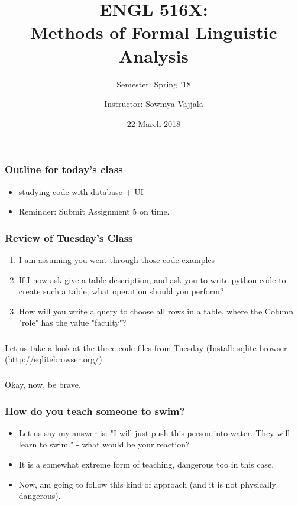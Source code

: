\documentclass{beamer}
\author[Sowmya Vajjala]{Instructor: Sowmya Vajjala}
\title[ENGL 516X]{ENGL 516X: \\ Methods of Formal Linguistic Analysis}
\subtitle{Semester: Spring '18}
\date{22 March 2018}
\institute{Iowa State University, USA}
\begin{document}
\begin{frame}\titlepage
\end{frame}

\begin{frame}
\frametitle{Outline for today's class}
\begin{itemize}
\item studying code with database + UI
\item Reminder: Submit Assignment 5 on time. 
\end{itemize}
\end{frame}

\begin{frame}%
\frametitle{Review of Tuesday's Class}
\begin{enumerate}
\item I am assuming you went through those code examples \pause
\item If I now ask give a table description, and ask you to write python code to create such a table, what operation should you perform? \pause
\item How will you write a query to choose all rows in a table, where the Column "role" has the value "faculty"? \pause
\end{enumerate}
\end{frame}

\begin{frame}
\frametitle{}
\centering
\Large Let us take a look at the three code files from Tuesday (Install: sqlite browser (http://sqlitebrowser.org/).
\end{frame}

\begin{frame}
\frametitle{}
\centering
\Large Okay, now, be brave.
\end{frame}

\begin{frame}
\frametitle{How do you teach someone to swim?}
\begin{itemize}
\item Let us say my answer is: "I will just push this person into water. They will learn to swim." - what would be your reaction?
\pause \item It is a somewhat extreme form of teaching, dangerous too in this case. 
\pause \item Now, am going to follow this kind of approach (and it is not physically dangerous).
\end{itemize}
\end{frame}
\end{document}
